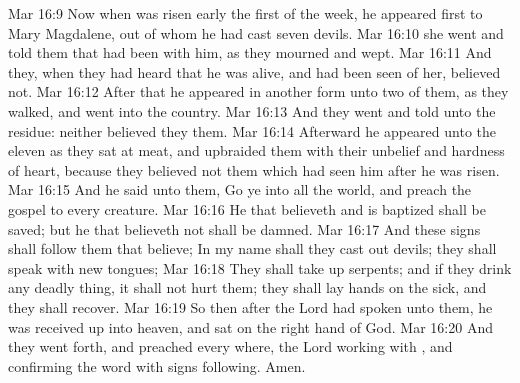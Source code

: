\vs Mar 16:9 Now when  was risen early the first  of the week, he appeared first to Mary Magdalene, out of whom he had cast seven devils.
\vs Mar 16:10  she went and told them that had been with him, as they mourned and wept.
\vs Mar 16:11 And they, when they had heard that he was alive, and had been seen of her, believed not.
\vs Mar 16:12 After that he appeared in another form unto two of them, as they walked, and went into the country.
\vs Mar 16:13 And they went and told  unto the residue: neither believed they them.
\vs Mar 16:14 Afterward he appeared unto the eleven as they sat at meat, and upbraided them with their unbelief and hardness of heart, because they believed not them which had seen him after he was risen.
\vs Mar 16:15 And he said unto them, Go ye into all the world, and preach the gospel to every creature.
\vs Mar 16:16 He that believeth and is baptized shall be saved; but he that believeth not shall be damned.
\vs Mar 16:17 And these signs shall follow them that believe; In my name shall they cast out devils; they shall speak with new tongues;
\vs Mar 16:18 They shall take up serpents; and if they drink any deadly thing, it shall not hurt them; they shall lay hands on the sick, and they shall recover.
\vs Mar 16:19 So then after the Lord had spoken unto them, he was received up into heaven, and sat on the right hand of God.
\vs Mar 16:20 And they went forth, and preached every where, the Lord working with , and confirming the word with signs following. Amen.
